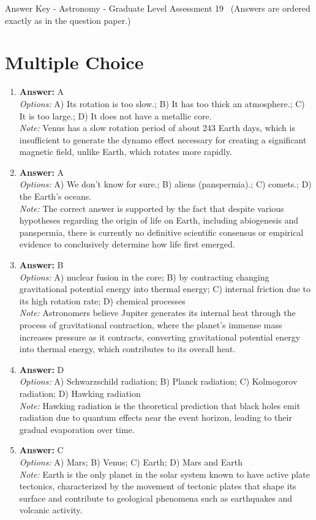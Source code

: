 \documentclass[12pt]{article}
\begin{document}
\begin{center}
Answer Key - Astronomy - Graduate Level Assessment 19 \
\small (Answers are ordered exactly as in the question paper.)
\end{center}

\section*{Multiple Choice}
\begin{enumerate}[label=\arabic*.]
\item \textbf{Answer:} A
\\ \textit{Options:} A) Its rotation is too slow.; B) It has too thick an atmosphere.; C) It is too large.; D) It does not have a metallic core.
\\ \textit{Note:} Venus has a slow rotation period of about 243 Earth days, which is insufficient to generate the dynamo effect necessary for creating a significant magnetic field, unlike Earth, which rotates more rapidly.
\item \textbf{Answer:} A
\\ \textit{Options:} A) We don't know for sure.; B) aliens (panspermia).; C) comets.; D) the Earth's oceans.
\\ \textit{Note:} The correct answer is supported by the fact that despite various hypotheses regarding the origin of life on Earth, including abiogenesis and panspermia, there is currently no definitive scientific consensus or empirical evidence to conclusively determine how life first emerged.
\item \textbf{Answer:} B
\\ \textit{Options:} A) nuclear fusion in the core; B) by contracting changing gravitational potential energy into thermal energy; C) internal friction due to its high rotation rate; D) chemical processes
\\ \textit{Note:} Astronomers believe Jupiter generates its internal heat through the process of gravitational contraction, where the planet's immense mass increases pressure as it contracts, converting gravitational potential energy into thermal energy, which contributes to its overall heat.
\item \textbf{Answer:} D
\\ \textit{Options:} A) Schwarzschild radiation; B) Planck radiation; C) Kolmogorov radiation; D) Hawking radiation
\\ \textit{Note:} Hawking radiation is the theoretical prediction that black holes emit radiation due to quantum effects near the event horizon, leading to their gradual evaporation over time.
\item \textbf{Answer:} C
\\ \textit{Options:} A) Mars; B) Venus; C) Earth; D) Mars and Earth
\\ \textit{Note:} Earth is the only planet in the solar system known to have active plate tectonics, characterized by the movement of tectonic plates that shape its surface and contribute to geological phenomena such as earthquakes and volcanic activity.
\end{enumerate}
\end{document}
